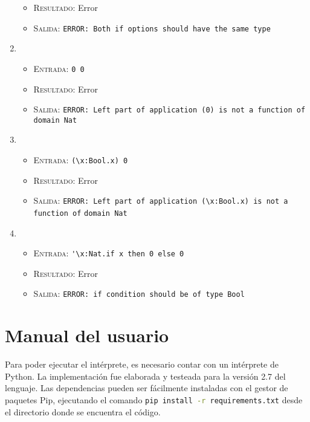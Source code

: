 \documentclass[11pt]{article}
\begin{document}
\begin{enumerate}
\begin{itemize}
    \item \textsc{Resultado:} Error
    \item \textsc{Salida:} \verb|ERROR: Both if options should have the same type|
    \end{itemize}
\item \begin{itemize}
    \item \textsc{Entrada:} \verb|0 0|
    \item \textsc{Resultado:} Error
    \item \textsc{Salida:} \verb|ERROR: Left part of application (0) is not a function of domain Nat|
    \end{itemize}
\item \begin{itemize}
    \item \textsc{Entrada:} \verb|(\x:Bool.x) 0|
    \item \textsc{Resultado:} Error
    \item \textsc{Salida:} \verb|ERROR: Left part of application (\x:Bool.x) is not a function of|
    	\verb|domain Nat|
    \end{itemize}
\item \begin{itemize}
    \item \textsc{Entrada:} \verb|'\x:Nat.if x then 0 else 0|
    \item \textsc{Resultado:} Error
    \item \textsc{Salida:} \verb|ERROR: if condition should be of type Bool|
    \end{itemize}
\end{enumerate}


\section{Manual del usuario}


Para poder ejecutar el intérprete, es necesario contar con un intérprete de
Python. La implementación fue elaborada y testeada para la versión 2.7 del
lenguaje. Las dependencias pueden ser fácilmente instaladas con el gestor de
paquetes Pip, ejecutando el comando \lstinline[language=bash]
{pip install -r requirements.txt} desde el directorio donde se encuentra el
código.
\end{document}
